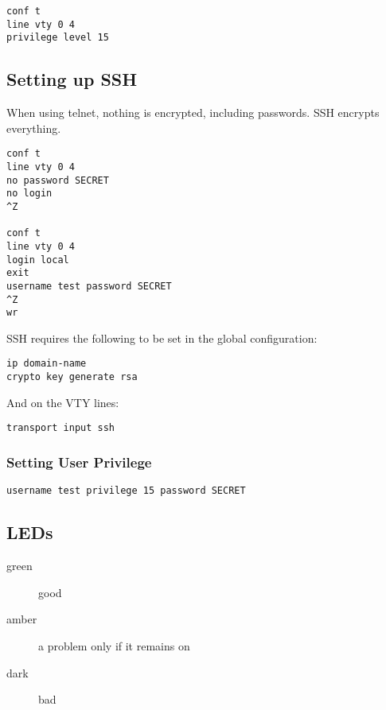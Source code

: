 \begin{verbatim}
conf t
line vty 0 4
privilege level 15
\end{verbatim}

\subsection{Setting up SSH}

When using telnet, nothing is encrypted, including passwords. SSH encrypts
everything.

\begin{verbatim}
conf t
line vty 0 4
no password SECRET
no login
^Z

conf t
line vty 0 4
login local
exit
username test password SECRET
^Z
wr
\end{verbatim}

SSH requires the following to be set in the global configuration:

\begin{verbatim}
ip domain-name
crypto key generate rsa
\end{verbatim}

And on the VTY lines:

\begin{verbatim}
transport input ssh
\end{verbatim}

\subsubsection{Setting User Privilege}

\begin{verbatim}
username test privilege 15 password SECRET
\end{verbatim}

\subsection{LEDs}

\begin{description}

\item[green]
good

\item[amber]
a problem only if it remains on

\item[dark]
bad

\end{description}

